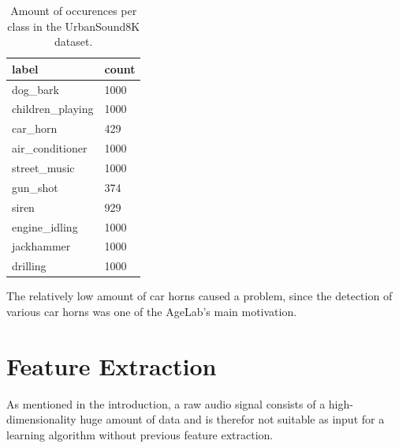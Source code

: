 \begin{table}[h]
\centering
\begin{tabular}{ll}
\hline
label & count \\
\hline
dog_bark & 1000 \\
children_playing & 1000 \\
car_horn & 429 \\
air_conditioner & 1000 \\
street_music & 1000 \\
gun_shot & 374 \\
siren & 929 \\
engine_idling & 1000 \\
jackhammer & 1000 \\
drilling & 1000
\end{tabular}
\caption{Amount of occurences per class in the UrbanSound8K dataset.}
\label{tbl:urbansound8kdistribution}
\par
\end{table}

The relatively low amount of car horns caused a problem, since the detection of various car horns was one of the AgeLab's main motivation.


\section{Feature Extraction}

As mentioned in the introduction, a raw audio signal consists of a high-dimensionality huge amount of data and is therefor not suitable as input for a learning algorithm without previous feature extraction.




